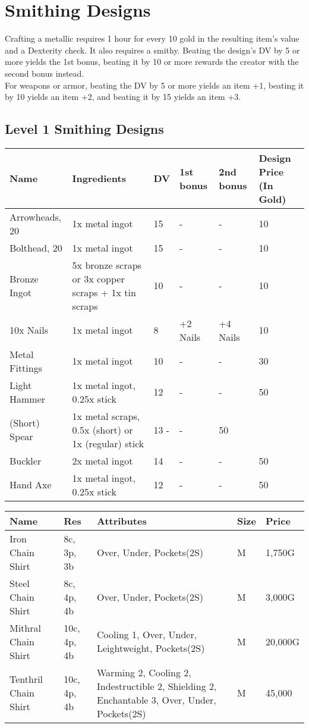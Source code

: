 \section{Smithing Designs}\label{sec:smithingDesigns}
Crafting a metallic requires 1 hour for every 10 gold in the resulting item's value and a Dexterity check.
It also requires a smithy.
Beating the design's DV by 5 or more yields the 1st bonus, beating it by 10 or more rewards the creator with the second bonus instead.\\
For weapons or armor, beating the DV by 5 or more yields an item +1, beating it by 10 yields an item +2, and beating it by 15 yields an item +3.\\

\subsection{Level 1 Smithing Designs}
\begin{longtable}{p{1.5cm} | p{2.5cm} | l | p{2cm} | p{2cm} | p{1cm} }
	Name & Ingredients & DV & 1st bonus & 2nd bonus & Design Price (In Gold)\\ \hline
	Arrowheads, 20 & 1x metal ingot & 15 & - & - & 10\\
	Bolthead, 20 & 1x metal ingot & 15 & - & - & 10\\
	Bronze Ingot & 5x bronze scraps or 3x copper scraps + 1x tin scraps & 10 & - & - & 10\\
	10x Nails & 1x metal ingot & 8 & +2 Nails & +4 Nails & 10\\
	Metal Fittings & 1x metal ingot & 10 & - & - & 30\\
	Light Hammer & 1x metal ingot, 0.25x stick & 12 & - & - & 50\\
	(Short) Spear & 1x metal scraps, 0.5x (short) or 1x (regular) stick & 13 - & - & 50\\
	Buckler & 2x metal ingot & 14 & - & - & 50\\
	Hand Axe & 1x metal ingot, 0.25x stick & 12 & - & - & 50\\
\end{longtable}

\begin{longtable}{p{3.5cm} | p{1.5cm} | p{5cm} | p{1cm} | p{1.25cm}}
	Name & Res &  Attributes & Size & Price\\ \hline
	Iron Chain Shirt & 8c, 3p, 3b & Over, Under, Pockets(2S) & M & 1,750G\\

	Steel Chain Shirt & 8c, 4p, 4b & Over, Under, Pockets(2S) & M & 3,000G\\

	Mithral Chain Shirt & 10c, 4p, 4b & Cooling 1, Over, Under, Leightweight, Pockets(2S) & M & 20,000G\\

	Tenthril Chain Shirt & 10c, 4p, 4b & Warming 2, Cooling 2, Indestructible 2, Shielding 2, Enchantable 3, Over, Under, Pockets(2S) & M & 45,000\\
\end{longtable}

